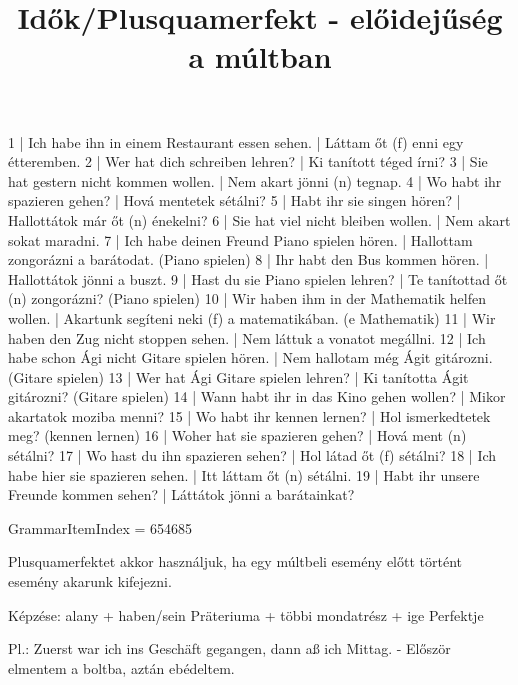 \begin{exmp}
1 | Ich habe ihn in einem Restaurant essen sehen. | Láttam őt (f) enni egy étteremben.
2 | Wer hat dich schreiben lehren? | Ki tanított téged írni?
3 | Sie hat gestern nicht kommen wollen. | Nem akart jönni (n) tegnap.
4 | Wo habt ihr spazieren gehen? | Hová mentetek sétálni? 
5 | Habt ihr sie singen hören? | Hallottátok már őt (n) énekelni?
6 | Sie hat viel nicht bleiben wollen. | Nem akart sokat maradni.
7 | Ich habe deinen Freund Piano spielen hören. | Hallottam zongorázni a barátodat. (Piano spielen)
8 | Ihr habt den Bus kommen hören. | Hallottátok jönni a buszt.
9 | Hast du sie Piano spielen lehren? | Te tanítottad őt (n) zongorázni? (Piano spielen)
10 | Wir haben ihm in der Mathematik helfen wollen. | Akartunk segíteni neki (f) a matematikában. (e Mathematik)
11 | Wir haben den Zug nicht stoppen sehen. | Nem láttuk a vonatot megállni.
12 | Ich habe schon Ági nicht Gitare spielen hören. | Nem hallotam még Ágit gitározni. (Gitare spielen)
13 | Wer hat Ági Gitare spielen lehren? | Ki tanította Ágit gitározni? (Gitare spielen)
14 | Wann habt ihr in das Kino gehen wollen? | Mikor akartatok moziba menni?
15 | Wo habt ihr kennen lernen? | Hol ismerkedtetek meg? (kennen lernen)
16 | Woher hat sie spazieren gehen? | Hová ment (n) sétálni?
17 | Wo hast du ihn spazieren sehen? | Hol látad őt (f) sétálni?
18 | Ich habe hier sie spazieren sehen. | Itt láttam őt (n) sétálni.
19 | Habt ihr unsere Freunde kommen sehen? | Láttátok jönni a barátainkat?
\end{exmp}

\title{Idők/Plusquamerfekt - előidejűség a múltban}

GrammarItemIndex = 654685

\begin{desc}
Plusquamerfektet akkor használjuk, ha egy múltbeli esemény előtt történt esemény akarunk kifejezni.

Képzése:
alany + haben/sein Präteriuma + többi mondatrész + ige Perfektje

Pl.: Zuerst war ich ins Geschäft gegangen, dann aß ich Mittag. - Először elmentem a boltba, aztán ebédeltem.
\end{desc}

